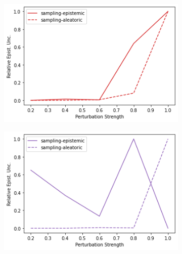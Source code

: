 \begin{figure}
    \begin{subfigure}{.245\textwidth}
        \includegraphics[width=\textwidth]{sections/011_icml2022/resources/transition_shift-DropOut-LunarLanderShift-v0-mean_epistemic_uncertainty_.png}
    \end{subfigure}
    \begin{subfigure}{.245\textwidth}
        \includegraphics[width=\textwidth]{sections/011_icml2022/resources/transition_shift-Ensemble-LunarLanderShift-v0-mean_epistemic_uncertainty_.png}
    \end{subfigure}
    \begin{subfigure}{.245\textwidth}

\end{subfigure}
\end{figure}
